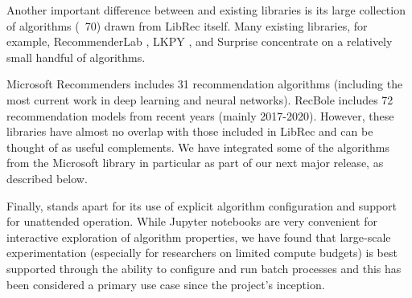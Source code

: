Another important difference between \libauto{} and existing libraries is its large collection of algorithms (~70) drawn from LibRec itself. Many existing libraries, for example, RecommenderLab \cite{hahsler2015recommenderlab}, LKPY \cite{LensKit2020}, and Surprise \cite{Hug2020} concentrate on a relatively small handful of algorithms.

Microsoft Recommenders \cite{MicrosoftRecommenders} includes 31 recommendation algorithms (including the most current work in deep learning and neural networks). RecBole \cite{recbole} includes 72 recommendation models from recent years (mainly 2017-2020). However, these libraries have almost no overlap with those included in LibRec and can be thought of as useful complements. We have integrated some of the algorithms from the Microsoft library in particular as part of our next major release, as described below.


Finally, \libauto{} stands apart for its use of explicit algorithm configuration and support for unattended operation. While Jupyter notebooks are very convenient for interactive exploration of algorithm properties, we have found that large-scale experimentation (especially for researchers on limited compute budgets) is best supported through the ability to configure and run batch processes and this has been considered a primary use case since the project's inception.



